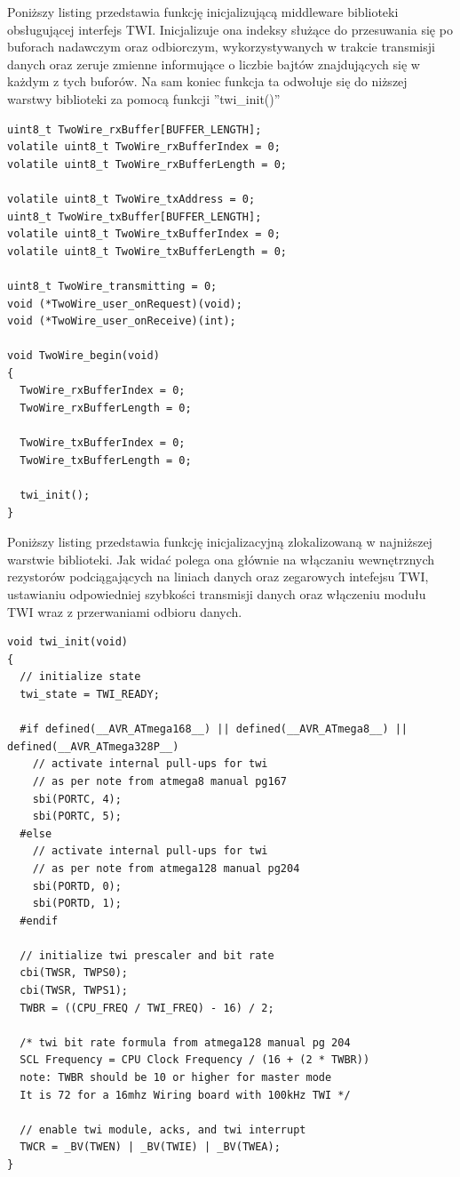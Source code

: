 Poniższy listing przedstawia funkcję inicjalizującą middleware biblioteki obsługującej interfejs TWI. Inicjalizuje ona indeksy służące do przesuwania się po buforach nadawczym oraz odbiorczym, wykorzystywanych w trakcie transmisji danych oraz zeruje zmienne informujące o liczbie bajtów znajdujących się w każdym z tych buforów. Na sam koniec funkcja ta odwołuje się do niższej warstwy biblioteki za pomocą funkcji ''twi\_init()''


\begin{lstlisting}
uint8_t TwoWire_rxBuffer[BUFFER_LENGTH];
volatile uint8_t TwoWire_rxBufferIndex = 0;
volatile uint8_t TwoWire_rxBufferLength = 0;

volatile uint8_t TwoWire_txAddress = 0;
uint8_t TwoWire_txBuffer[BUFFER_LENGTH];
volatile uint8_t TwoWire_txBufferIndex = 0;
volatile uint8_t TwoWire_txBufferLength = 0;

uint8_t TwoWire_transmitting = 0;
void (*TwoWire_user_onRequest)(void);
void (*TwoWire_user_onReceive)(int);

void TwoWire_begin(void)
{
  TwoWire_rxBufferIndex = 0;
  TwoWire_rxBufferLength = 0;

  TwoWire_txBufferIndex = 0;
  TwoWire_txBufferLength = 0;

  twi_init();
}
\end{lstlisting}

Poniższy listing przedstawia funkcję inicjalizacyjną zlokalizowaną w najniższej warstwie biblioteki. Jak widać polega ona głównie na włączaniu wewnętrznych rezystorów podciągających na liniach danych oraz zegarowych intefejsu TWI, ustawianiu odpowiedniej szybkości transmisji danych oraz włączeniu modułu TWI wraz z przerwaniami odbioru danych.

\begin{lstlisting}
void twi_init(void)
{
  // initialize state
  twi_state = TWI_READY;

  #if defined(__AVR_ATmega168__) || defined(__AVR_ATmega8__) || defined(__AVR_ATmega328P__)
    // activate internal pull-ups for twi
    // as per note from atmega8 manual pg167
    sbi(PORTC, 4);
    sbi(PORTC, 5);
  #else
    // activate internal pull-ups for twi
    // as per note from atmega128 manual pg204
    sbi(PORTD, 0);
    sbi(PORTD, 1);
  #endif

  // initialize twi prescaler and bit rate
  cbi(TWSR, TWPS0);
  cbi(TWSR, TWPS1);
  TWBR = ((CPU_FREQ / TWI_FREQ) - 16) / 2;

  /* twi bit rate formula from atmega128 manual pg 204
  SCL Frequency = CPU Clock Frequency / (16 + (2 * TWBR))
  note: TWBR should be 10 or higher for master mode
  It is 72 for a 16mhz Wiring board with 100kHz TWI */

  // enable twi module, acks, and twi interrupt
  TWCR = _BV(TWEN) | _BV(TWIE) | _BV(TWEA);
}
\end{lstlisting}

